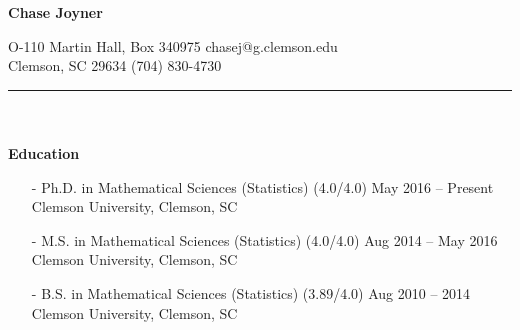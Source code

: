 \documentclass[10pt]{article}
\begin{document}
\begin{center}
{\Large \textbf{Chase Joyner}}
\end{center}
O-110 Martin Hall, Box 340975 \hfill chasej@g.clemson.edu \\
Clemson, SC 29634 \hfill (704) 830-4730 \\
\rule{18.08cm}{0.20mm} \\ \\
\noindent
\textbf{Education}
\begin{itemize}
\item[-] Ph.D. in Mathematical Sciences (Statistics) (4.0/4.0) \hfill May 2016 -- Present \\
Clemson University, Clemson, SC
\item[-] M.S. in Mathematical Sciences (Statistics) (4.0/4.0) \hfill Aug 2014 -- May 2016 \\
Clemson University, Clemson, SC
\item[-] B.S. in Mathematical Sciences (Statistics) (3.89/4.0) \hfill Aug 2010 -- 2014 \\
Clemson University, Clemson, SC
\end{itemize}
\end{document}
